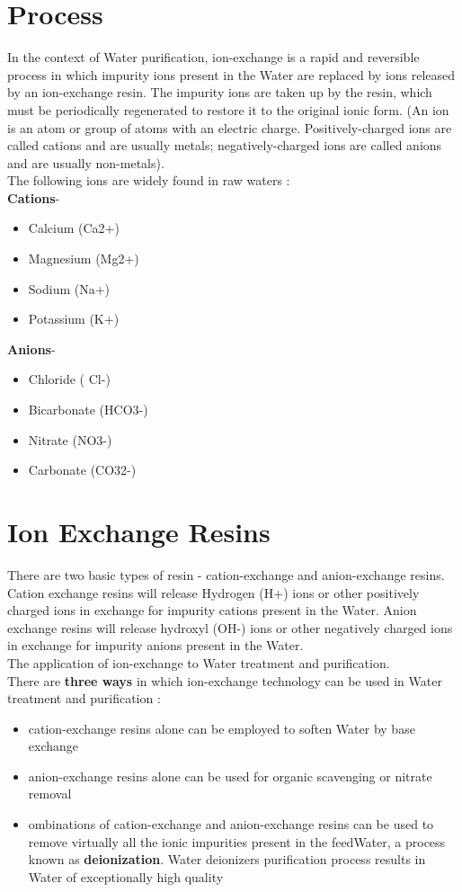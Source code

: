 \documentclass[english,11pt]{report}
\begin{document}
\section{Process}
In the context of Water purification, ion-exchange is a rapid and reversible process in which impurity ions present in the Water are replaced by ions released by an ion-exchange resin. The impurity ions are taken up by the resin, which must be periodically regenerated to restore it to the original ionic form. (An ion is an atom or group of atoms with an electric charge. Positively-charged ions are called cations and are usually metals; negatively-charged ions are called anions and are usually non-metals).\\
The following ions are widely found in raw waters : \\
\textbf{Cations}-
\begin{itemize}
    \item Calcium (Ca2+)
    \item Magnesium (Mg2+)
    \item Sodium (Na+)
    \item Potassium (K+)
\end{itemize}
\textbf{Anions}-
\begin{itemize}
    \item Chloride ( Cl-)
    \item Bicarbonate (HCO3-)
    \item Nitrate (NO3-)
    \item Carbonate (CO32-)
\end{itemize}

\section{Ion Exchange Resins}
There are two basic types of resin - cation-exchange and anion-exchange resins. Cation exchange resins will release Hydrogen (H+) ions or other positively charged ions in exchange for impurity cations present in the Water. Anion exchange resins will release hydroxyl (OH-) ions or other negatively charged ions in exchange for impurity anions present in the Water.\\
The application of ion-exchange to Water treatment and purification. \\
There are \textbf{three ways} in which ion-exchange technology can be used in Water treatment and purification :
\begin{itemize}
    \item cation-exchange resins alone can be employed to soften Water by base exchange
    \item anion-exchange resins alone can be used for organic scavenging or nitrate removal
    \item ombinations of cation-exchange and anion-exchange resins can be used to remove virtually all the ionic impurities present in the feedWater, a process known as \textbf{deionization}. Water deionizers purification process results in Water of exceptionally high quality
\end{itemize}
\end{document}
